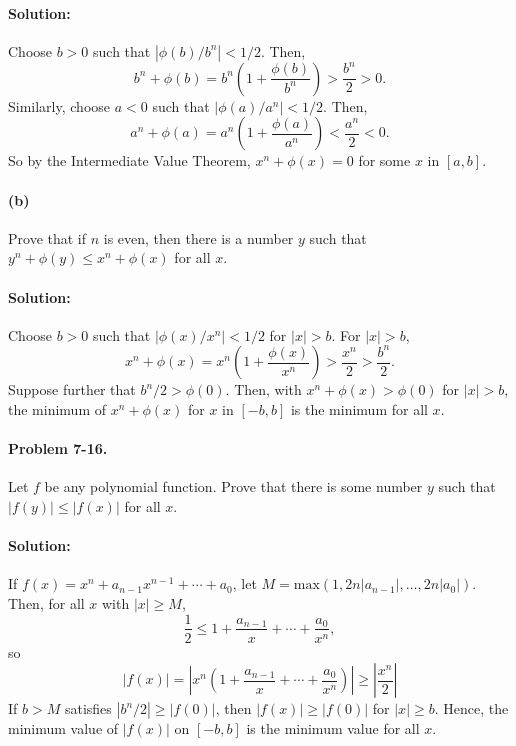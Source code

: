 \documentclass{article}
\begin{document}
\paragraph{Solution:} Choose $b > 0$ such that $|\phi(b)/b^n| < 1/2$. Then,
\begin{equation*}
  b^n + \phi(b) = b^n\left(1 + \frac{\phi(b)}{b^n}\right) > \frac{b^n}{2} > 0.
\end{equation*}
Similarly, choose $a < 0$ such that $|\phi(a)/a^n| < 1/2$. Then,
\begin{equation*}
  a^n + \phi(a) = a^n\left(1 + \frac{\phi(a)}{a^n}\right) < \frac{a^n}{2} < 0.
\end{equation*}
So by the Intermediate Value Theorem, $x^n + \phi(x) = 0$ for some $x$ in $[a,
b]$.

\paragraph{(b)} Prove that if $n$ is even, then there is a number $y$ such that
$y^n + \phi(y) \leq x^n + \phi(x)$ for all $x$.

\paragraph{Solution:} Choose $b > 0$ such that $|\phi(x)/x^n| < 1/2$ for $|x| >
b$. For $|x| > b$, \begin{equation*}
  x^n + \phi(x) = x^n\left(1 + \frac{\phi(x)}{x^n}\right) > \frac{x^n}{2} >
    \frac{b^n}{2}.
\end{equation*}
Suppose further that $b^n/2 > \phi(0)$. Then, with $x^n + \phi(x) > \phi(0)$
for $|x| > b$, the minimum of $x^n + \phi(x)$ for $x$ in $[-b, b]$ is the
minimum for all $x$.

\paragraph{Problem 7-16.} Let $f$ be any polynomial function. Prove that there
is some number $y$ such that $|f(y)| \leq |f(x)|$ for all $x$.

\paragraph{Solution:} If $f(x) = x^n + a_{n-1}x^{n-1} + \cdots + a_0$, let $M =
\mathrm{max}(1, 2n|a_{n-1}|, \ldots, 2n|a_0|)$. Then, for all $x$ with $|x|
\geq M$, \begin{equation*}
  \frac{1}{2} \leq 1 + \frac{a_{n-1}}{x} + \cdots + \frac{a_0}{x^n},
\end{equation*} so \begin{equation*}
  |f(x)| = \left|x^n\left(1 + \frac{a_{n-1}}{x} + \cdots + \frac{a_0}{x^n}
    \right)\right| \geq \left|\frac{x^n}{2}\right|
\end{equation*}
If $b > M$ satisfies $|b^n/2| \geq |f(0)|$, then $|f(x)| \geq |f(0)|$ for $|x|
\geq b$. Hence, the minimum value of $|f(x)|$ on $[-b, b]$ is the minimum value
for all $x$.
\end{document}
